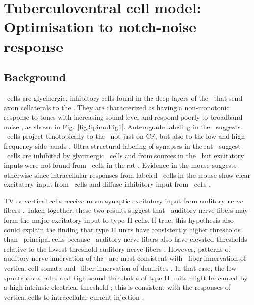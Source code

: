 
\section[TV Cell Model]{Tuberculoventral cell model: Optimisation to
  notch-noise response}
\label{sec:TV-cell-model}

\subsection{Background}

\TV~cells are glycinergic, inhibitory cells found in the deep layers of the
\DCN~that send axon collaterals to the \VCN\@. They are characterized as having
a non-monotonic response to tones with increasing sound level and respond poorly
to broadband noise
\citep{SpirouDavisEtAl:1999,NelkenYoung:1997,ReissYoung:2005}, as shown in
Fig.~\ref{fig:SpirouFig1}.  Anterograde labeling in the \DCN~suggests \TV~cells
project tonotopically to the \VCN~not just on-CF, but also to the low and high
frequency side bands
\citep{MunirathinamOstapoffEtAl:2004,OstapoffMorestEtAl:1999}.  Ultra-structural
labeling of synapses in the rat \DCN~suggest \TV~cells are inhibited by
glycinergic \DS~cells and from sources in the \DCN~but excitatory inputs were
not found from \TS~cells in the rat \citep{Rubio:2005}. Evidence in the mouse
suggests otherwise since intracellular responses from labeled \TV~cells in the
mouse show clear excitatory input from \TS~cells and diffuse inhibitory input
from \DS~cells \citep{ZhangOertel:1993b,WickesbergOertel:1993}.

\smallskip{}

TV or vertical cells receive mono-synaptic excitatory input from auditory nerve
ﬁbers \citep{OertelWu:1989,ZhangOertel:1993b}. Taken together, these two results
suggest that \LSR~auditory nerve ﬁbers may form the major excitatory input to
type~II cells. If true, this hypothesis also could explain the ﬁnding that type
II units have consistently higher thresholds than \DCN~principal cells
\citep{YoungBrownell:1976} because \LSR~auditory nerve ﬁbers also have elevated
thresholds relative to the lowest threshold auditory nerve ﬁbers
\citep{Liberman:1978}. However, patterns of auditory nerve innervation of the
\DCN~are most consistent with \HSR~ﬁber innervation of vertical cell somata and
\LSR~ﬁber innervation of dendrites \citep{Liberman:1993}. In that case, the low
spontaneous rates and high sound thresholds of type II units might be caused by
a high intrinsic electrical threshold \citep{HancockDavisEtAl:1997}; this is
consistent with the responses of vertical cells to intracellular current
injection \citep{DingVoigt:1997,ZhangOertel:1993b}.

